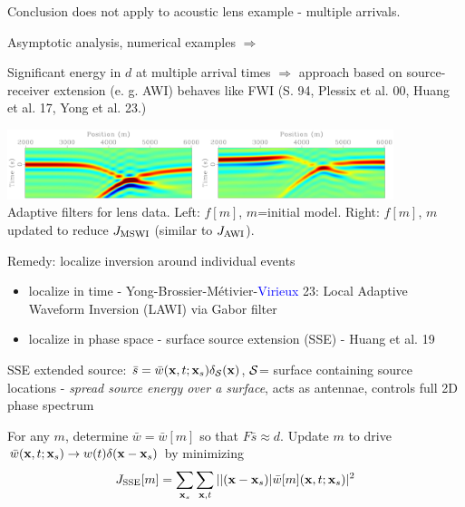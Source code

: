 \documentclass[xcolor=dvipsnames,12pt,aspectratio=169]{beamer}
\begin{document}
\begin{frame}
  Conclusion does not apply to acoustic lens example - multiple
  arrivals.

  Asymptotic analysis, numerical examples $\Rightarrow$

  Significant energy in $d$ at multiple arrival times $\Rightarrow$
  approach based on source-receiver extension (e. g. AWI) behaves like
  FWI (S. 94, Plessix et al. 00, Huang et al. 17, Yong et al. 23.)

\begin{center}
\hspace{-0.5in}\includegraphics[height=0.8in]{Fig/uest0wind.pdf}\includegraphics[height=0.8in]{Fig/uestmswiwind.pdf}\\

Adaptive filters for lens data. Left: $f[m]$, $m$=initial model. Right: $f[m]$, $m$ updated to reduce
$J_{\rm MSWI}$ (similar to $J_{\rm AWI}$).
\end{center}
\end{frame}

\begin{frame}
  Remedy: localize inversion around individual events

  \begin{itemize}
  \item localize in time - Yong-Brossier-Métivier-\textcolor{blue}{Virieux} 23: Local
    Adaptive Waveform Inversion (LAWI) via Gabor filter
  \item localize in phase space - surface source extension (SSE) -
    Huang et al. 19
  \end{itemize}

  SSE extended source: $\bar{s} = \bar{w}(\mathbf{x},t;\mathbf{x}_s)\delta_{{\cal
      S}}(\mathbf{x})$, ${\cal S} $= surface containing source locations -
  {\em spread source energy over a surface}, acts as antennae,
  controls full 2D phase spectrum

For any $m$, determine $\bar{w}=\bar{w}[m]$ so that $F\bar{s} \approx d$. Update $m$ to drive
$\bar{w}(\mathbf{x},t;\mathbf{x}_s) \rightarrow w(t)\delta(\mathbf{x}-\mathbf{x}_s)$ by minimizing
\[
  J_{\rm SSE}[m] = \sum_{\mathbf{x}_s}\sum_{\mathbf{x},t} ||(\mathbf{x}-\mathbf{x}_s)|
  \bar{w}[m](\mathbf{x},t;\mathbf{x}_s)|^2
 \]
\end{frame}
\end{document}
